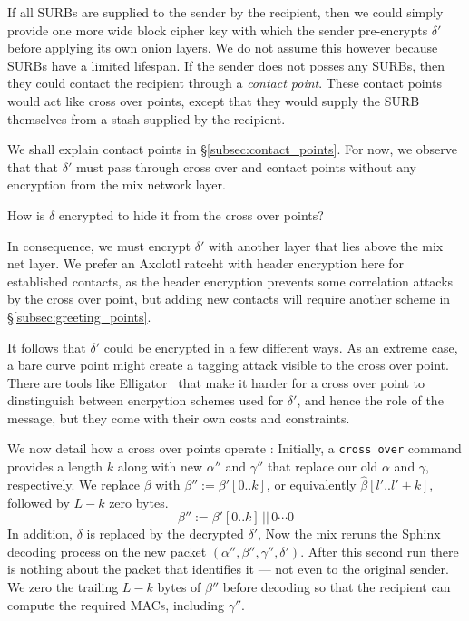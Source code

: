 If all SURBs are supplied to the sender by the recipient, then
we could simply provide one more wide block cipher key with which
the sender pre-encrypts $\delta'$ before applying its own onion layers.
We do not assume this however because SURBs have a limited lifespan. 
If the sender does not posses any SURBs, then they could contact the
recipient through a {\em contact point}.  These contact points would
act like cross over points, except that they would supply the SURB
themselves from a stash supplied by the recipient.
  
We shall explain contact points in \S\ref{subsec:contact_points}.
For now, we observe that that $\delta'$ must pass through cross over
and contact points without any encryption from the mix network layer. 

\begin{issue}
How is $\delta$ encrypted to hide it from the cross over points?
\end{issue}

In consequence, we must encrypt $\delta'$ with another layer that
lies above the mix net layer.  We prefer an Axolotl ratceht with
header encryption here for established contacts, as the header
encryption prevents some correlation attacks by the cross over
point, but adding new contacts will require another scheme in
\S\ref{subsec:greeting_points}.  

It follows that $\delta'$ could be encrypted in a few different ways.
As an extreme case, a bare curve point might create a tagging attack
visible to the cross over point.  
There are tools like Elligator~\cite{elligator} that make it harder
for a cross over point to dinstinguish between encrpytion schemes
used for $\delta'$, and hence the role of the message, but they
come with their own costs and constraints. 

\smallskip

We now detail how a cross over points operate : 
Initially, a {\tt cross over} command provides a length $k$ along
with new $\alpha''$ and $\gamma''$ that replace our old $\alpha$ and
$\gamma$, respectively. 
We replace $\beta$ with $\beta'' := \beta'[0..k]$, or equivalently
$\hat\beta[l'..l'+k]$, followed by $L-k$ zero bytes.
\[ \beta'' :=  \beta'[0..k] \,||\, 0\cdots0 \]
In addition, $\delta$ is replaced by the decrypted $\delta'$, 
Now the mix reruns the Sphinx decoding process on the new packet
$(\alpha'',\beta'',\gamma'',\delta')$. 
After this second run there is nothing about the packet that 
identifies it --- not even to the original sender.
We zero the trailing $L-k$ bytes of $\beta''$ before decoding so that
the recipient can compute the required MACs, including $\gamma''$.

